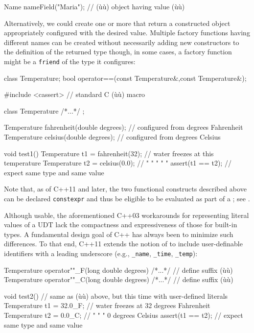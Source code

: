 \begin{emcppslisting}[emcppsbatch=e1]
Name nameField("Maria");  // (ù{}ù) object having value (ù{}ù)
\end{emcppslisting}
    
\noindent Alternatively, we could create one or more 
that return a constructed object appropriately configured with the
desired value. Multiple factory functions having different names can be
created without necessarily adding new constructors to the definition of
the returned type though, in some cases, a factory function might be a
\lstinline!friend! of the type it configures:

\begin{emcppshiddenlisting}[emcppsbatch=e2]
class Temperature;
bool operator==(const Temperature&,const Temperature&);
\end{emcppshiddenlisting}
\begin{emcppslisting}[emcppsbatch=e2]
#include <cassert>  // standard C (ù{}ù) macro

class Temperature { /*...*/ };

Temperature fahrenheit(double degrees);  // configured from degrees Fahrenheit
Temperature celsius(double degrees);     // configured from degrees Celsius

void test1()
{
    Temperature t1 = fahrenheit(32);  // water freezes at this temperature
    Temperature t2 = celsius(0.0);    //   "      "     "  "        "
    assert(t1 == t2);                 // expect same type and same value
}
\end{emcppslisting}
    
\noindent  Note that, as of C++11 and later, the two functional constructs
described above can be declared \lstinline!constexpr! and thus be eligible
to be evaluated as part of a ; see
. 

Although usable, the aforementioned C++03 workarounds for representing
literal values of a UDT lack the compactness and expressiveness of those
for built-in types. A fundamental design goal of C++ has always been to
minimize such differences. To that end, C++11 extends the notion of
 to include user-definable identifiers with
a leading underscore (e.g., \lstinline!_name!, \lstinline!_time!,
\lstinline!_temp!):

\begin{emcppslisting}[emcppsbatch=e2]
Temperature operator""_F(long double degrees) { /*...*/ }  // define suffix (ù{}ù)
Temperature operator""_C(long double degrees) { /*...*/ }  // define suffix (ù{}ù)

void test2()  // same as (ù{}ù) above, but this time with user-defined literals
{
    Temperature t1 = 32.0_F; // water freezes at 32 degrees Fahrenheit
    Temperature t2 = 0.0_C;  //   "      "     "  0 degrees Celsius
    assert(t1 == t2);        // expect same type and same value
}
\end{emcppslisting}
    
